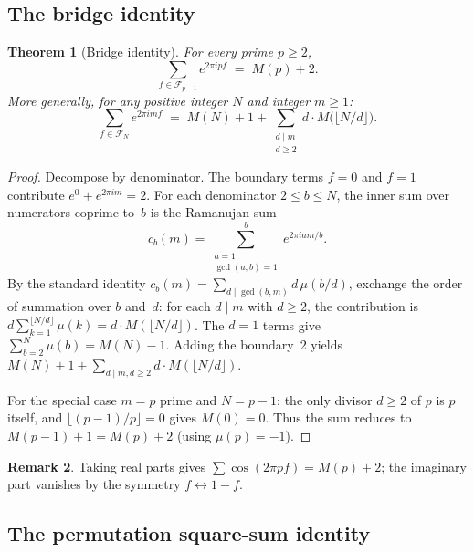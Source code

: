 \documentclass[11pt]{article}
\newtheorem{theorem}{Theorem}[section]
\theoremstyle{definition}
\newtheorem{remark}[theorem]{Remark}
\newcommand{\F}{\mathcal{F}}
\begin{document}
\subsection{The bridge identity}\label{sec:bridge}

\begin{theorem}[Bridge identity]\label{thm:bridge}
For every prime $p \ge 2$,
\begin{equation}\label{eq:bridge}
  \sum_{f \in \F_{p-1}} e^{2\pi i p f} \;=\; M(p) + 2.
\end{equation}
More generally, for any positive integer $N$ and integer $m \ge 1$:
\begin{equation}\label{eq:universal}
  \sum_{f \in \F_N} e^{2\pi i m f} \;=\; M(N) + 1
    + \sum_{\substack{d \mid m \\ d \ge 2}} d \cdot M\!\bigl(\lfloor N/d \rfloor\bigr).
\end{equation}
\end{theorem}

\begin{proof}
Decompose by denominator.  The boundary terms $f = 0$ and $f = 1$
contribute $e^0 + e^{2\pi im} = 2$.  For each denominator
$2 \le b \le N$, the inner sum over numerators coprime to~$b$ is the
Ramanujan sum
\[
  c_b(m) = \sum_{\substack{a=1 \\ \gcd(a,b) = 1}}^{b}
    e^{2\pi i am/b}.
\]
By the standard identity $c_b(m) = \sum_{d \mid \gcd(b,m)}
d\,\mu(b/d)$, exchange the order of summation over $b$ and~$d$:
for each $d \mid m$ with $d \ge 2$, the contribution is
$d \sum_{k=1}^{\lfloor N/d \rfloor} \mu(k) = d \cdot M(\lfloor N/d \rfloor)$.
The $d = 1$ terms give $\sum_{b=2}^{N} \mu(b) = M(N) - 1$.
Adding the boundary~$2$ yields $M(N) + 1 + \sum_{d \mid m, d \ge 2}
d \cdot M(\lfloor N/d \rfloor)$.

For the special case $m = p$ prime and $N = p-1$: the only
divisor $d \ge 2$ of $p$ is $p$ itself, and
$\lfloor (p-1)/p \rfloor = 0$ gives $M(0) = 0$.  Thus the sum
reduces to $M(p-1) + 1 = M(p) + 2$ (using $\mu(p) = -1$).
\end{proof}

\begin{remark}
Taking real parts gives $\sum \cos(2\pi pf) = M(p) + 2$; the
imaginary part vanishes by the symmetry $f \leftrightarrow 1 - f$.
\end{remark}

\subsection{The permutation square-sum identity}\label{sec:perm-sq}
\end{document}
